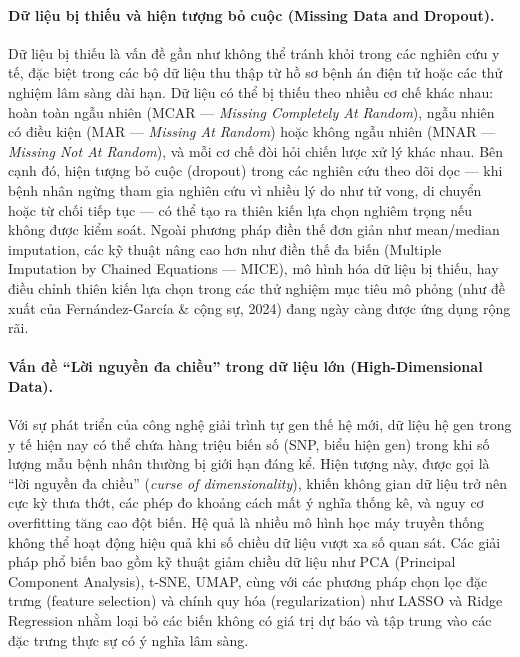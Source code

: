 \paragraph{Dữ liệu bị thiếu và hiện tượng bỏ cuộc (Missing Data and Dropout).}
Dữ liệu bị thiếu là vấn đề gần như không thể tránh khỏi trong các nghiên cứu y tế, đặc biệt trong các bộ dữ liệu thu thập từ hồ sơ bệnh án điện tử hoặc các thử nghiệm lâm sàng dài hạn. Dữ liệu có thể bị thiếu theo nhiều cơ chế khác nhau: hoàn toàn ngẫu nhiên (MCAR --- \textit{Missing Completely At Random}), ngẫu nhiên có điều kiện (MAR --- \textit{Missing At Random}) hoặc không ngẫu nhiên (MNAR --- \textit{Missing Not At Random}), và mỗi cơ chế đòi hỏi chiến lược xử lý khác nhau. Bên cạnh đó, hiện tượng bỏ cuộc (dropout) trong các nghiên cứu theo dõi dọc --- khi bệnh nhân ngừng tham gia nghiên cứu vì nhiều lý do như tử vong, di chuyển hoặc từ chối tiếp tục --- có thể tạo ra thiên kiến lựa chọn nghiêm trọng nếu không được kiểm soát. Ngoài phương pháp điền thế đơn giản như mean/median imputation, các kỹ thuật nâng cao hơn như điền thế đa biến (Multiple Imputation by Chained Equations --- MICE), mô hình hóa dữ liệu bị thiếu, hay điều chỉnh thiên kiến lựa chọn trong các thử nghiệm mục tiêu mô phỏng (như đề xuất của Fernández-García \& cộng sự, 2024) đang ngày càng được ứng dụng rộng rãi.
 
\paragraph{Vấn đề ``Lời nguyền đa chiều'' trong dữ liệu lớn (High-Dimensional Data).}
Với sự phát triển của công nghệ giải trình tự gen thế hệ mới, dữ liệu hệ gen trong y tế hiện nay có thể chứa hàng triệu biến số (SNP, biểu hiện gen) trong khi số lượng mẫu bệnh nhân thường bị giới hạn đáng kể. Hiện tượng này, được gọi là ``lời nguyền đa chiều'' (\textit{curse of dimensionality}), khiến không gian dữ liệu trở nên cực kỳ thưa thớt, các phép đo khoảng cách mất ý nghĩa thống kê, và nguy cơ overfitting tăng cao đột biến. Hệ quả là nhiều mô hình học máy truyền thống không thể hoạt động hiệu quả khi số chiều dữ liệu vượt xa số quan sát. Các giải pháp phổ biến bao gồm kỹ thuật giảm chiều dữ liệu như PCA (Principal Component Analysis), t-SNE, UMAP, cùng với các phương pháp chọn lọc đặc trưng (feature selection) và chính quy hóa (regularization) như LASSO và Ridge Regression nhằm loại bỏ các biến không có giá trị dự báo và tập trung vào các đặc trưng thực sự có ý nghĩa lâm sàng.
